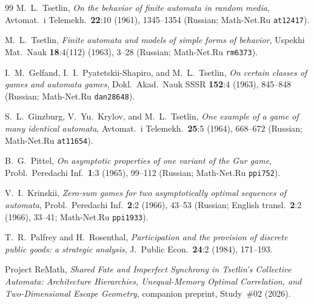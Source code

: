 \documentclass[11pt,reqno]{amsart}
\theoremstyle{definition}
\theoremstyle{remark}
\begin{document}
\begin{thebibliography}{99}
M.~L.~Tsetlin, \emph{On the behavior of finite automata in random media}, Avtomat.\ i Telemekh.\ \textbf{22}:10 (1961), 1345--1354 (Russian; Math-Net.Ru \texttt{at12417}).

M.~L.~Tsetlin, \emph{Finite automata and models of simple forms of behavior}, Uspekhi Mat.\ Nauk \textbf{18}:4(112) (1963), 3--28 (Russian; Math-Net.Ru \texttt{rm6373}).

I.~M.~Gelfand, I.~I.~Pyatetskii-Shapiro, and M.~L.~Tsetlin, \emph{On certain classes of games and automata games}, Dokl.\ Akad.\ Nauk SSSR \textbf{152}:4 (1963), 845--848 (Russian; Math-Net.Ru \texttt{dan28648}).

S.~L.~Ginzburg, V.~Yu.~Krylov, and M.~L.~Tsetlin, \emph{One example of a game of many identical automata}, Avtomat.\ i Telemekh.\ \textbf{25}:5 (1964), 668--672 (Russian; Math-Net.Ru \texttt{at11654}).

B.~G.~Pittel, \emph{On asymptotic properties of one variant of the Gur game}, Probl.\ Peredachi Inf.\ \textbf{1}:3 (1965), 99--112 (Russian; Math-Net.Ru \texttt{ppi752}).

V.~I.~Krinskii, \emph{Zero-sum games for two asymptotically optimal sequences of automata}, Probl.\ Peredachi Inf.\ \textbf{2}:2 (1966), 43--53 (Russian; English transl.\ \textbf{2}:2 (1966), 33--41; Math-Net.Ru \texttt{ppi1933}).

T.~R.~Palfrey and H.~Rosenthal, \emph{Participation and the provision of discrete public goods: a strategic analysis}, J.\ Public Econ.\ \textbf{24}:2 (1984), 171--193.

Project ReMath, \emph{Shared Fate and Imperfect Synchrony in Tsetlin's Collective Automata: Architecture Hierarchies, Unequal-Memory Optimal Correlation, and Two-Dimensional Escape Geometry}, companion preprint, Study~\#02 (2026).
\end{thebibliography}
\end{document}

